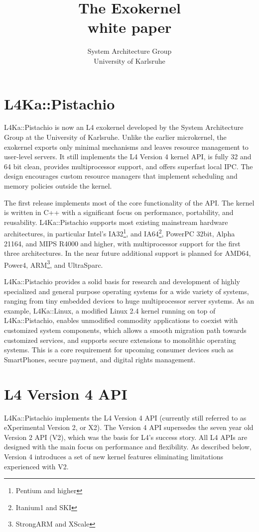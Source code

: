 \documentclass[twoside]{whitepaper}
\title{{\Huge The \Pistachio Exokernel}\\white paper}
\author{System Architecture Group\\University of Karlsruhe}
\newcommand{\Pistachio}{L4Ka::Pistachio\xspace}
\newcommand{\Lx}{L4Ka::Linux\xspace}
\begin{document}
\sffamily
\maketitle

\section{\Pistachio}

\Pistachio is now an L4 exokernel developed by the System
Architecture Group at the University of Karlsruhe.  Unlike the earlier
microkernel, the exokernel exports only minimal mechanisms and leaves
resource management to user-level servers.  It still implements the
L4 Version 4 kernel API, is fully 32 and 64 bit clean, provides
multiprocessor support, and offers superfast local IPC.  The design
encourages custom resource managers that implement scheduling and
memory policies outside the kernel.

The first release implements most of the core
functionality of the API.  The kernel is written in C++ with a
significant focus on performance, portability, and reusability.
\Pistachio supports most existing mainstream hardware architectures,
in particular Intel's IA32\footnote{Pentium and higher}, and
IA64\footnote{Itanium1 and SKI}, PowerPC 32bit, Alpha 21164, and MIPS
R4000 and higher, with multiprocessor support for the first three
architectures.  In the near future additional support is planned for
AMD64, Power4, ARM\footnote{StrongARM and XScale}, and UltraSparc.

\Pistachio provides a solid basis for research and development of
highly specialized and general purpose operating systems for a wide
variety of systems, ranging from tiny embedded devices to huge
multiprocessor server systems.  As an example, \Lx, a modified Linux 2.4 kernel running on top of \Pistachio,
enables unmodified commodity applications to coexist with customized 
system components, which allows a smooth migration path towards customized
services, and supports secure extensions to monolithic operating systems.  
This is a core requirement for upcoming consumer devices such as
SmartPhones, secure payment, and digital rights management.


\section{L4 Version 4 API}
\Pistachio implements the L4 Version 4 API (currently still referred to
as eXperimental Version 2, or X2).  The Version 4 API supersedes the
seven year old Version 2 API (V2), which was the basis for L4's success
story.  All L4 APIs are designed with the main focus on performance
and flexibility.  As described below, Version 4 introduces a set of
new kernel features eliminating limitations experienced with V2.
\end{document}

